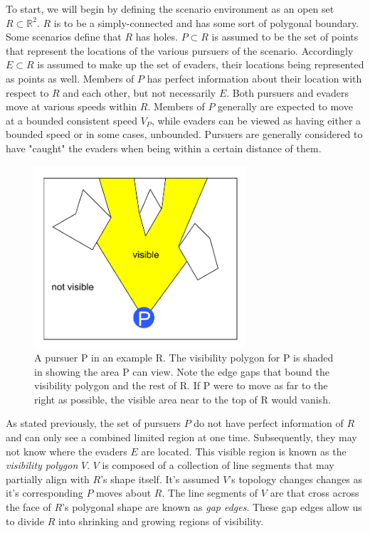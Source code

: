 \documentclass{article}
\begin{document}
To start, we will begin by defining the scenario environment as an open set \(R\subset\mathbb{R}^2\). \(R\) is to be a simply-connected and has some sort of polygonal boundary. Some scenarios define that \(R\) has holes. \(P\subset R\) is assumed to be the set of points that represent the locations of the various pursuers of the scenario. Accordingly \(E\subset R\) is assumed to make up the set of evaders, their locations being represented as points as well. Members of \(P\) has perfect information about their location with respect to \(R\) and each other, but not necessarily \(E\). Both pursuers and evaders move at various speeds within \(R\). Members of \(P\) generally are expected to move at a bounded consistent speed \(V_P\), while evaders can be viewed as having either a bounded speed or in some cases, unbounded. \cite{limVis, robotics} Pursuers are generally considered to have "caught" the evaders when being within a certain distance of them.

\begin{figure}[htb]
\centering
\includegraphics[width=0.7\textwidth]{"visPoly"}
\caption{A pursuer P in an example R. The visibility polygon for P is shaded in showing the area P can view. Note the edge gaps that bound the visibility polygon and the rest of R. If P were to move as far to the right as possible, the visible area near to the top of R would vanish.}
\end{figure}

As stated previously, the set of pursuers \(P\) do not have perfect information of \(R\) and can only see a combined limited region at one time. Subsequently, they may not know where the evaders \(E\) are located. This visible region is known as the \emph{visibility polygon} \(V\). \(V\) is composed of a collection of line segments that may partially align with \(R\)'s shape itself. It's assumed \(V\)'s topology changes changes as it's corresponding \(P\) moves about \(R\). The line segments of \(V\) are that cross across the face of \(R\)'s polygonal shape are known as \emph{gap edges}. These gap edges allow us to divide \(R\) into shrinking and growing regions of visibility. \cite{limVis, robotics}
\end{document}
